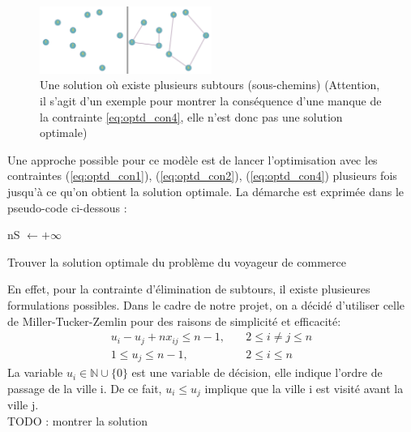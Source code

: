 \documentclass{article}
\begin{document}
\begin{figure}[h]\centering
\includegraphics[width=0.5\textwidth]{graphe_avec_subtour}
\caption{Une solution où existe plusieurs subtours (sous-chemins) (Attention, il s'agit d'un exemple pour montrer la conséquence d'une manque de la contrainte \ref{eq:optd_con4}, elle n'est donc pas une solution optimale)}

\end{figure}
Une approche possible pour ce modèle est de lancer l'optimisation avec les contraintes (\ref{eq:optd_con1}), (\ref{eq:optd_con2}), (\ref{eq:optd_con4}) plusieurs fois jusqu'à ce qu'on obtient la solution optimale. La démarche est exprimée dans le pseudo-code ci-dessous :\\
\begin{algorithm}[H] 
   nS \(\leftarrow +\infty\)  \;
 \caption{Trouver la solution optimale du problème du voyageur de commerce}
\end{algorithm}
En effet, pour la contrainte d'élimination de subtours, il existe plusieures formulations possibles. Dans le cadre de notre projet, on a décidé d'utiliser celle de Miller-Tucker-Zemlin pour des raisons de simplicité et efficacité:
\begin{equation}
\begin{aligned}
	u_i - u_j + nx_{ij} \leq n - 1, \quad & 2 \leq i \neq j \leq n \\
	1 \leq u_j \leq n - 1, \quad & 2 \leq i \leq n
\end{aligned}
\end{equation}
La variable \(u_i \in \mathbb{N} \cup \{0\}\) est une variable de décision, elle indique l'ordre de passage de la ville i. De ce fait, \(u_i \leq u_j\) implique que la ville i est visité avant la ville j.\\
TODO : montrer la solution\\
\end{document}
